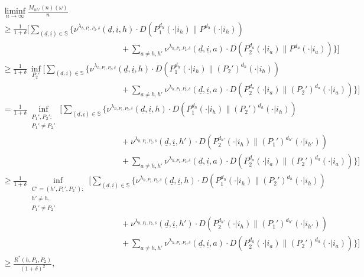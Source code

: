 \begin{align}
	&\liminf\limits_{n\to \infty}\frac{M_{hh'}(n)(\omega)}{n} \nonumber\\
	&\geq \frac{1}{1+\delta} \bigg[
\sum\limits_{(\underline{d}, \underline{i})\in \mathbb{S}}\bigg\lbrace\nu^{\lambda_{h, P_1, P_2, \delta}}(\underline{d}, \underline{i}, h)\cdot  D(P_1^{d_h}(\cdot|i_h) \| P^{d_h}(\cdot|i_h)) \nonumber\\
&\hspace{6cm}+ \sum\limits_{a\neq h, h'} \nu^{\lambda_{h, P_1, P_2, \delta}}(\underline{d}, \underline{i}, a) \cdot D(P_2^{d_a}(\cdot|i_a) \| P^{d_a}(\cdot|i_a))\bigg\rbrace\bigg]\nonumber\\
&\geq \frac{1}{1+\delta} ~\inf\limits_{P_2'}\bigg[
\sum\limits_{(\underline{d}, \underline{i})\in \mathbb{S}}\bigg\lbrace\nu^{\lambda_{h, P_1, P_2, \delta}}(\underline{d}, \underline{i}, h)\cdot  D(P_1^{d_h}(\cdot|i_h) \| (P_2')^{d_h}(\cdot|i_h)) \nonumber\\
&\hspace{6cm}+ \sum\limits_{a\neq h, h'} \nu^{\lambda_{h, P_1, P_2, \delta}}(\underline{d}, \underline{i}, a) \cdot D(P_2^{d_a}(\cdot|i_a) \| (P_2')^{d_a}(\cdot|i_a))\bigg\rbrace\bigg]\nonumber\\
&=\frac{1}{1+\delta} \inf\limits_{\substack{P_1', P_2':\\P_1'\neq P_2'}}\bigg[
\sum\limits_{(\underline{d}, \underline{i})\in \mathbb{S}}\bigg\lbrace\nu^{\lambda_{h, P_1, P_2, \delta}}(\underline{d}, \underline{i}, h)\cdot  D(P_1^{d_h}(\cdot|i_h) \| (P_2')^{d_h}(\cdot|i_h)) \nonumber\\
&\hspace{6cm}+ \nu^{\lambda_{h, P_1, P_2, \delta}}(\underline{d}, \underline{i}, h')\cdot  D(P_2^{d_{h'}}(\cdot|i_h) \| (P_1')^{d_{h'}}(\cdot|i_{h'}))\nonumber \\
&\hspace{6cm}+ \sum\limits_{a\neq h, h'} \nu^{\lambda_{h, P_1, P_2, \delta}}(\underline{d}, \underline{i}, a) \cdot D(P_2^{d_a}(\cdot|i_a) \| (P_2')^{d_a}(\cdot|i_a))\bigg\rbrace\bigg]\nonumber\\
&\geq \frac{1}{1+\delta} \inf\limits_{\substack{C'=(h', P_1', P_2'):\\h'\neq h,\\P_1'\neq P_2'}}\bigg[
\sum\limits_{(\underline{d}, \underline{i})\in \mathbb{S}}\bigg\lbrace\nu^{\lambda_{h, P_1, P_2, \delta}}(\underline{d}, \underline{i}, h)\cdot  D(P_1^{d_h}(\cdot|i_h) \| (P_2')^{d_h}(\cdot|i_h)) \nonumber\\
&\hspace{6cm}+ \nu^{\lambda_{h, P_1, P_2, \delta}}(\underline{d}, \underline{i}, h')\cdot  D(P_2^{d_{h'}}(\cdot|i_h) \| (P_1')^{d_{h'}}(\cdot|i_{h'}))\nonumber \\
&\hspace{6cm}+ \sum\limits_{a\neq h, h'} \nu^{\lambda_{h, P_1, P_2, \delta}}(\underline{d}, \underline{i}, a) \cdot D(P_2^{d_a}(\cdot|i_a) \| (P_2')^{d_a}(\cdot|i_a))\bigg
\rbrace\bigg]\nonumber\\
	&\geq \frac{R^*(h, P_1, P_2)}{(1+\delta)^2},
\end{align}
